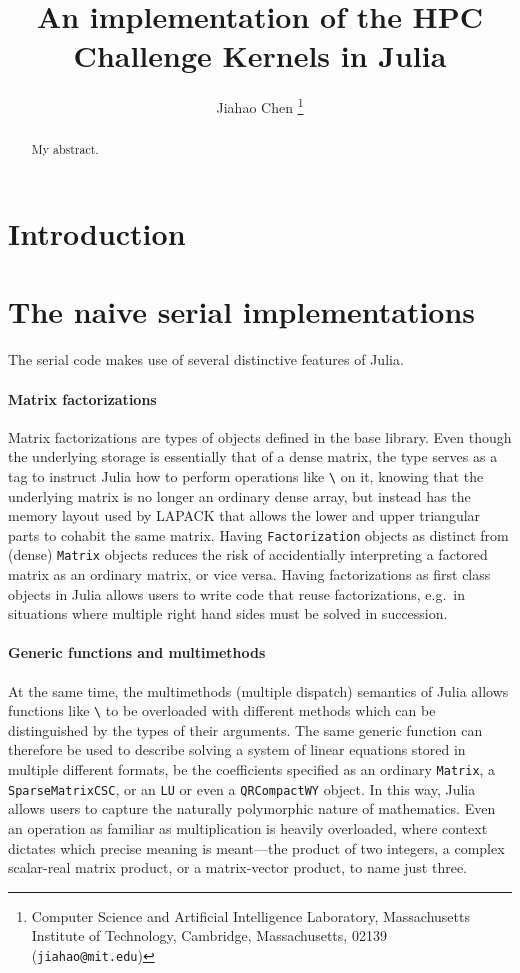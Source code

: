\documentclass{article}
\title{An implementation of the HPC Challenge Kernels in Julia}
\author{%
    Jiahao Chen
    \thanks{Computer Science and Artificial Intelligence Laboratory,
           Massachusetts Institute of Technology,
           Cambridge, Massachusetts, 02139 ({\tt jiahao@mit.edu})}
}
\begin{document}
\maketitle

\begin{abstract}
My abstract.
\end{abstract}

\listoftodos

\section{Introduction}

\section{The naive serial implementations}



%

The serial code makes use of several distinctive features of Julia.

\paragraph{Matrix factorizations}
Matrix factorizations are types of objects defined in the base library. Even
though the underlying storage is essentially that of a dense matrix, the type
serves as a tag to instruct Julia how to perform operations like \lstinline|\|
on it, knowing that the underlying matrix is no longer an ordinary dense array,
but instead has the memory layout used by LAPACK that allows the lower and
upper triangular parts to cohabit the same matrix. Having
\lstinline|Factorization| objects as distinct from (dense) \lstinline|Matrix|
objects reduces the risk of accidentially interpreting a factored matrix as an
ordinary matrix, or vice versa.  Having factorizations as first class objects
in Julia allows users to write code that reuse factorizations, e.g.\ in
situations where multiple right hand sides must be solved in succession.

\paragraph{Generic functions and multimethods}
At the same time, the multimethods (multiple dispatch) semantics of Julia
allows functions like \lstinline|\| to be overloaded with different methods
which can be distinguished by the types of their arguments. The same generic
function can therefore be used to describe solving a system of linear equations
stored in multiple different formats, be the coefficients specified as an
ordinary \lstinline|Matrix|, a \lstinline|SparseMatrixCSC|, or an
\lstinline|LU| or even a \lstinline|QRCompactWY| object. In this way, Julia
allows users to capture the naturally polymorphic nature of mathematics. Even
an operation as familiar as multiplication is heavily overloaded, where context
dictates which precise meaning is meant---the product of two integers, a
complex scalar-real matrix product, or a matrix-vector product, to name just
three.
\end{document}
